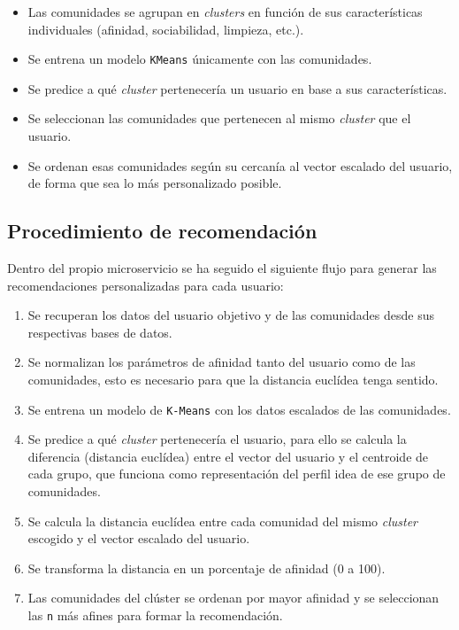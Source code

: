 \vspace{0.5em}
\begin{itemize}
    \item Las comunidades se agrupan en \textit{clusters} en función de sus características individuales (afinidad, sociabilidad, limpieza, etc.).
    \item Se entrena un modelo \texttt{KMeans} únicamente con las comunidades.
    \item Se predice a qué \textit{cluster} pertenecería un usuario en base a sus características.
    \item Se seleccionan las comunidades que pertenecen al mismo \textit{cluster} que el usuario.
    \item Se ordenan esas comunidades según su cercanía al vector escalado del usuario, de forma que sea lo más personalizado posible.
\end{itemize}

\subsection*{Procedimiento de recomendación}

Dentro del propio microservicio se ha seguido el siguiente flujo para generar las recomendaciones personalizadas para cada usuario:

\begin{enumerate}[label=\textbf{\arabic*.}]
    \item Se recuperan los datos del usuario objetivo y de las comunidades desde sus respectivas bases de datos.
    \item Se normalizan los parámetros de afinidad tanto del usuario como de las comunidades, esto es necesario para que la distancia euclídea tenga sentido.
    \item Se entrena un modelo de \texttt{K-Means} con los datos escalados de las comunidades.
    \item Se predice a qué \textit{cluster} pertenecería el usuario, para ello se calcula la diferencia (distancia euclídea) entre el vector del usuario y el centroide de cada grupo, que funciona como representación del perfil idea de ese grupo de comunidades.
    \item Se calcula la distancia euclídea entre cada comunidad del mismo \textit{cluster} escogido y el vector escalado del usuario.
    \item Se transforma la distancia en un porcentaje de afinidad (0 a 100).
    \item Las comunidades del clúster se ordenan por mayor afinidad y se seleccionan las \texttt{n} más afines para formar la recomendación.
\end{enumerate}
\vspace{0.5em}


